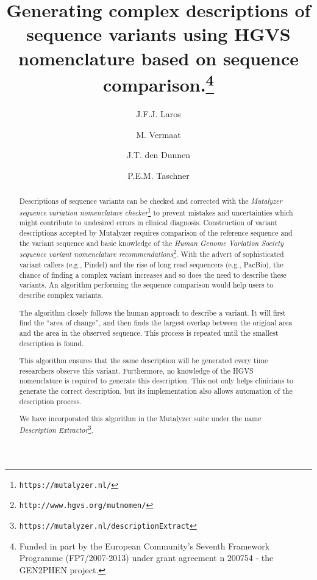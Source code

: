 \documentclass{article}
\author{J.F.J. Laros \and M. Vermaat \and J.T. den Dunnen \and P.E.M. Taschner}
\title{Generating complex descriptions of sequence variants using HGVS
  nomenclature based on sequence comparison.\footnote{Funded in part by the
  European Community's Seventh Framework Programme (FP7/2007-2013) under grant
  agreement n\superscript{o} 200754 - the GEN2PHEN project.}}
\begin{document}
\maketitle

\begin{abstract} \noindent
Descriptions of sequence variants can be checked and corrected with the
\emph{Mutalyzer sequence variation nomenclature
checker}\footnote{\texttt{https://mutalyzer.nl/}} to prevent mistakes and
uncertainties which might contribute to undesired errors in clinical diagnosis.
Construction of variant descriptions accepted by Mutalyzer requires comparison
of the reference sequence and the variant sequence and basic knowledge of the
\emph{Human Genome Variation Society sequence variant nomenclature
recommendations}\footnote{\texttt{http://www.hgvs.org/mutnomen/}}. With the
advert of sophisticated variant callers (e.g., Pindel) and the rise of long
read sequencers (e.g., PacBio), the chance of finding a complex variant
increases and so does the need to describe these variants. An algorithm
performing the sequence comparison would help users to describe complex
variants.

The algorithm closely follows the human approach to describe a variant. It will
first find the ``area of change'', and then finds the largest overlap between
the original area and the area in the observed sequence. This process is
repeated until the smallest description is found.

This algorithm ensures that the same description will be generated every time
researchers observe this variant. Furthermore, no knowledge of the HGVS
nomenclature is required to generate this description. This not only helps
clinicians to generate the correct description, but its implementation also
allows automation of the description process.

We have incorporated this algorithm in the Mutalyzer suite under the name
\emph{Description
Extractor}\footnote{\texttt{https://mutalyzer.nl/descriptionExtract}}.
\end{abstract}
\end{document}
